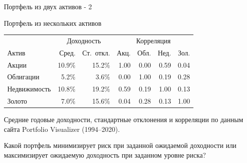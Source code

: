 \documentclass{beamer}
\begin{document}
\begin{frame}{Портфель из двух активов - 2}
\centering
{}
\end{frame}



\begin{frame}{Портфель из нескольких активов}
\centering
\begin{tabular}{l|r|r|r|r|r|r}
 & \multicolumn{2}{c|}{Доходность} & \multicolumn{4}{c}{Корреляция} \\ \cline{2-7}
Актив         & Сред.  & Ст.~откл. & Акц. & Обл. & Нед. & Зол. \\ \hline
Акции         & 10.9\% & 15.2\%    & 1.00  & 0.00   & 0.59    & 0.04 \\
Облигации     & 5.2\%  & 3.6\%     & 0.00  & 1.00   & 0.19    & 0.28 \\
Недвижимость  & 10.8\% & 19.2\%    & 0.59  & 0.19   & 1.00    & 0.13 \\
Золото        & 7.0\%  & 15.6\%    & 0.04  & 0.28   & 0.13    & 1.00
\end{tabular}

\justify
{\scriptsize
Средние годовые доходности, стандартные отклонения и корреляции по данным сайта 
Portfolio Visualizer (1994--2020).
}

\justify
Какой портфель минимизирует риск при заданной ожидаемой доходности или 
максимизирует ожидаемую доходность при заданном уровне риска?
\end{frame}
\end{document}
